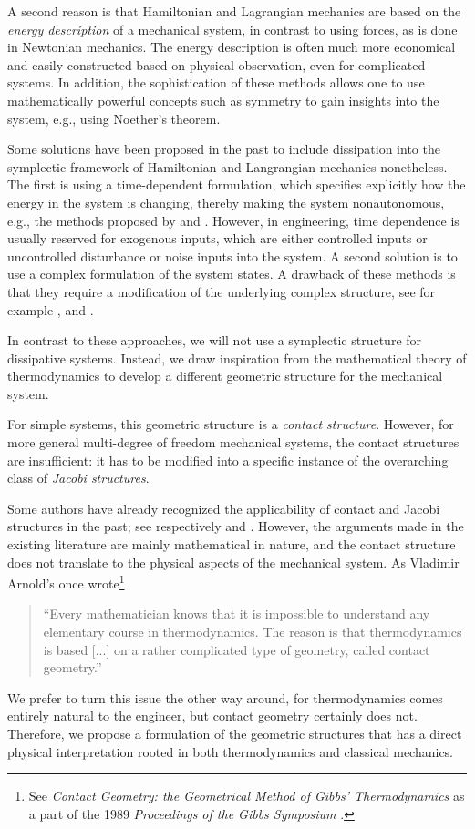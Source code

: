 A second reason is that Hamiltonian and Lagrangian mechanics are based on the \emph{energy description} of a mechanical system, in contrast to using forces, as is done in Newtonian mechanics. The energy description is often much more economical and easily constructed based on physical observation, even for complicated systems. In addition, the sophistication of these methods allows one to use mathematically powerful concepts such as symmetry to gain insights into the system, e.g., using Noether's theorem.

Some solutions have been proposed in the past to include dissipation into the symplectic framework of Hamiltonian and Langrangian mechanics nonetheless. The first is using a time-dependent formulation, which specifies explicitly how the energy in the system is changing, thereby making the system nonautonomous, e.g., the methods proposed by \citet{Caldirola1941} and \citet{Kanai1948}. However, in engineering, time dependence is usually reserved for exogenous inputs, which are either controlled inputs or uncontrolled disturbance or noise inputs into the system. A second solution is to use a complex formulation of the system states. A drawback of these methods is that they require a modification of the underlying complex structure, see for example \citet{Hutters2020}, \citet{Dedene1980} and \citet{Rajeev2007}.

In contrast to these approaches, we will not use a symplectic structure for dissipative systems. Instead, we draw inspiration from the mathematical theory of thermodynamics to develop a different geometric structure for the mechanical system.

For simple systems, this geometric structure is a \emph{contact structure}. However, for more general multi-degree of freedom mechanical systems, the contact structures are insufficient: it has to be modified into a specific instance of the overarching class of \emph{Jacobi structures}. 

Some authors have already recognized the applicability of contact and Jacobi structures in the past; see respectively \citet{Bravetti2017} and \citet{ciaglia2018}. However, the arguments made in the existing literature are mainly mathematical in nature, and the contact structure does not translate to the physical aspects of the mechanical system. As Vladimir Arnold's once wrote\footnote{See \emph{Contact Geometry: the Geometrical Method of Gibbs' Thermodynamics} as a part of the 1989 \emph{Proceedings of the Gibbs Symposium} \cite[p. 163]{Arnold1989b}.}
\begin{quote}
``Every mathematician knows that it is impossible to understand any elementary course in thermodynamics. The reason is that thermodynamics is based [...] on a rather complicated type of geometry, called contact geometry.''
\end{quote}
We prefer to turn this issue the other way around, for thermodynamics comes entirely natural to the engineer, but contact geometry certainly does not. Therefore, we propose a formulation of the geometric structures that has a direct physical interpretation rooted in both thermodynamics and classical mechanics.

